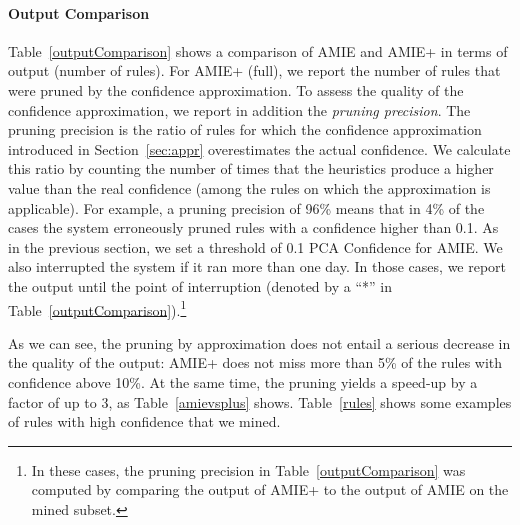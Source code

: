 \paragraph{Output Comparison}
Table~\ref{outputComparison} shows a comparison of AMIE and AMIE+ in terms of output (number of rules).
For AMIE+ (full), we report the number of rules that were pruned by the confidence approximation.
To assess the quality of the confidence approximation, we report in addition the \emph{pruning precision}.
The pruning precision is the ratio of rules for which the confidence approximation introduced
in Section~\ref{sec:appr} overestimates the actual confidence. We
calculate this ratio by counting the number of times that the heuristics
produce a higher value than the real confidence (among the rules on which the approximation is applicable).
For example, a pruning precision of 96\% means
that in 4\% of the cases the system erroneously pruned rules with a confidence higher than 0.1.
As in the previous section, we set a threshold of 0.1 PCA Confidence for AMIE. We also interrupted the system
if it ran more than one day. In those cases, we report the output until the point of interruption (denoted by a ``*'' in Table~\ref{outputComparison}).\footnote{In these cases, the pruning precision in Table~\ref{outputComparison} was computed by comparing the output of AMIE+ to the output of AMIE on the mined subset.}

As we can see, the pruning by approximation does not entail a serious decrease in the quality of the output:
AMIE+ does not miss more than 5\% of the rules with confidence above 10\%.
At the same time, the pruning yields a speed-up by a factor of up to 3, as Table~\ref{amievsplus} shows. Table~\ref{rules} shows some examples of rules with high confidence that we mined.


